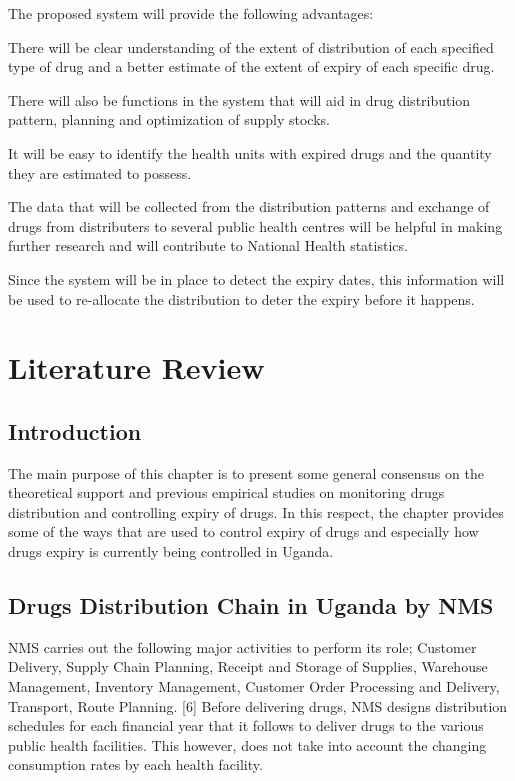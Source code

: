 \documentclass[12pt, a4paper]{report}
\begin{document}
The proposed system will provide the following advantages:

There will be clear understanding of the extent of distribution of each specified type of drug and a better estimate of the extent of expiry of each specific drug.  

There will also be functions in the system that will aid in drug distribution pattern, planning and optimization of supply stocks.  

It will be easy to identify the health units with expired drugs and the quantity they are estimated to possess.  

The data that will be collected from the distribution patterns and exchange of drugs from distributers to several public health centres will be helpful in making further research and will contribute to National Health statistics.  

Since the system will be in place to detect the expiry dates, this information will be used to re-allocate the distribution to deter the expiry before it happens. 

%

\chapter{Literature Review}


\section{Introduction}

The main purpose of this chapter is to present some general consensus on the theoretical support and previous empirical studies on monitoring drugs distribution and controlling expiry of drugs.  In this respect, the chapter provides some of the ways that are used to control expiry of drugs and especially how drugs expiry is currently being controlled in Uganda.

\section{Drugs Distribution Chain in Uganda by NMS}
NMS carries out the following major activities to perform its role; 
Customer Delivery, Supply Chain Planning, Receipt and Storage of Supplies, Warehouse Management, Inventory Management, Customer Order Processing and Delivery, Transport, Route Planning. [6] Before delivering drugs, NMS designs distribution schedules for each financial year that it follows to deliver drugs to the various public health facilities. This however, does not take into account the changing consumption rates by each health facility. 
\end{document}
